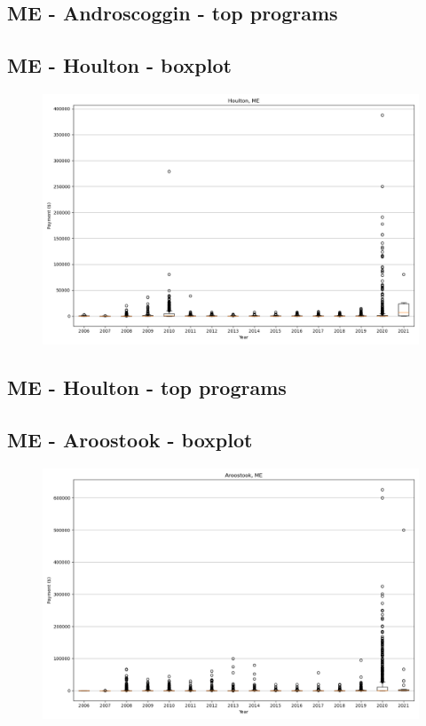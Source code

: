\subsection*{ME - Androscoggin - top programs}

\newpage
\subsection*{ME - Houlton - boxplot}
\begin{figure}[h]
\centering
\includegraphics[width=7in]{../output/boxplots/counties/Houlton-ME_boxplot.png}
\end{figure}


\subsection*{ME - Houlton - top programs}

\newpage
\subsection*{ME - Aroostook - boxplot}
\begin{figure}[h]
\centering
\includegraphics[width=7in]{../output/boxplots/counties/Aroostook-ME_boxplot.png}
\end{figure}


